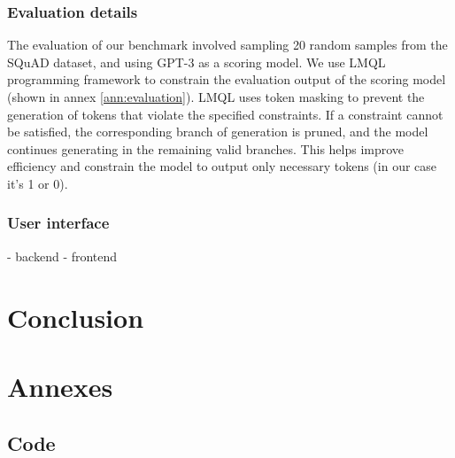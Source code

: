 \documentclass[a4paper,12pt]{article}
\begin{document}
\subsubsection*{Evaluation details}
The evaluation of our benchmark involved sampling 20 random samples from the SQuAD \cite{squad} dataset, and using GPT-3 \cite{gpt3} as a scoring model.
We use LMQL \cite{lmql} programming framework to constrain the evaluation output of the scoring model (shown in annex \ref*{ann:evaluation}). LMQL uses token masking to prevent the generation of tokens that violate the specified constraints. 
If a constraint cannot be satisfied, the corresponding branch of generation is pruned, and the model continues generating in the remaining valid branches. This helps improve efficiency and constrain the model to output only necessary tokens 
(in our case it's 1 or 0).

\subsubsection*{User interface}
- backend
- frontend

\section{Conclusion}

\twocolumn


\clearpage


\onecolumn
\section{Annexes}

\subsection{Code}
\end{document}
